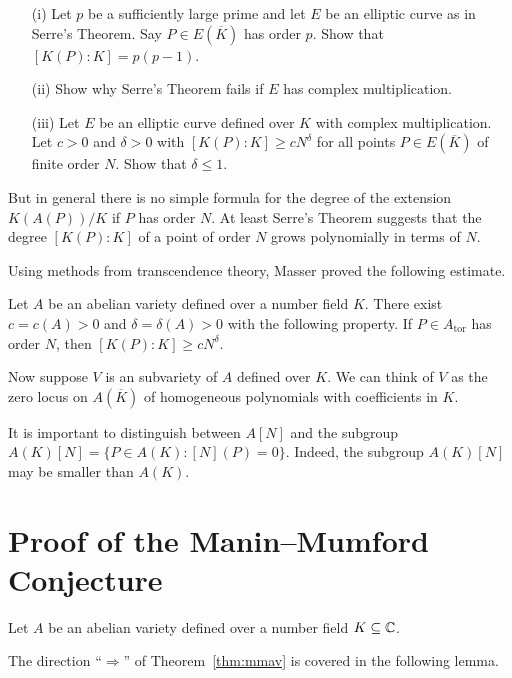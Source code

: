 \begin{exercise}
  \begin{enumerate}
  \item [(i)]  Let $p$ be a sufficiently large prime and let $E$ be
    an elliptic curve as in Serre's Theorem. Say $P\in E(\overline K)$ has
    order $p$. Show that $[K(P):K] = p(p-1)$.
  \item[(ii)] Show why Serre's Theorem fails if $E$ has complex
    multiplication.
  \item[(iii)] Let $E$ be an elliptic curve defined over $K$  with
    complex multiplication. Let $c>0$ and $\delta>0$ with
    $[K(P):K]\ge c N^{\delta}$ for all points $P\in E(\overline K)$ of
    finite order $N$. Show that $\delta \le 1$. 
  \end{enumerate}
\end{exercise}

But in general there is no simple formula for the degree of the
extension $K(A(P))/K$ if $P$ has order $N$. At least Serre's Theorem
suggests that the degree $[K(P):K]$ of a point of order $N$ grows
polynomially in terms of $N$.

Using methods from transcendence theory, Masser proved the following
estimate.

\begin{theorem}
  \label{thm:masser}
  Let $A$ be an abelian variety defined over a number field $K$. There
  exist $c=c(A)>0$ and $\delta=\delta(A)>0$ with the following
  property. If $P \in A_{\mathrm{tor}}$ has order $N$, then
  $[K(P):K]\ge c N^{\delta}$. 
\end{theorem}


Now suppose $V$ is an  subvariety of $A$ defined over $K$. We can
think of $V$ as the zero locus on $A(\overline K)$ of homogeneous
polynomials with coefficients in $K$. 

It is important to distinguish between $A[N]$ and the subgroup
$A(K)[N] = \{P\in A(K) : [N](P)=0\}$. Indeed, the subgroup $A(K)[N]$ may be
smaller than $A(K)$.


\section{Proof of the Manin--Mumford Conjecture}

Let $A$ be an abelian variety defined over a number field
$K\subseteq{\mathbb{C}}$.

The direction ``$\Longrightarrow$'' of Theorem~\ref{thm:mmav} is covered in
the following lemma.

